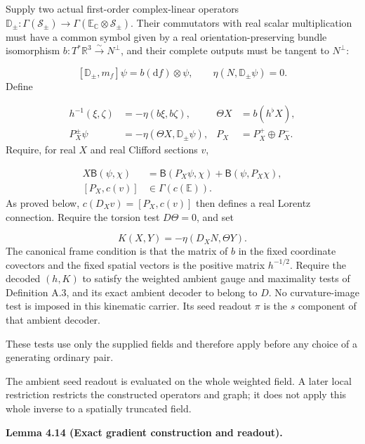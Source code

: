\documentclass[
  english,
  11pt,
  reqno]{amsart}
\makeatletter
\newcommand{\pandocstatementheading}[1]{%
  \par\addpenalty{\@beginparpenalty}%
  \addvspace{.5\baselineskip plus .2\baselineskip minus .2\baselineskip}%
  {\normalfont\bfseries #1\par}%
  \nobreak\@afterindenttrue\@afterheading
}
\makeatother
\begin{document}
Supply two actual first-order complex-linear operators
\(\mathbb D_\pm:\Gamma(\mathscr S_\pm)\to\Gamma(\mathbb E_{\mathbb C}\otimes\mathscr S_\pm)\).
Their commutators with real scalar multiplication must have a common
symbol given by a real orientation-preserving bundle isomorphism
\(b:T^*\mathbb R^3\xrightarrow{\sim}N^\perp\), and their complete
outputs must be tangent to \(N^\perp\):

\label{eq:online-source-symbol-and-tangential-tests} \[
[\mathbb D_\pm,m_f]\psi=b(\mathrm df)\otimes\psi,
\qquad \eta(N,\mathbb D_\pm\psi)=0.
\] Define

\label{eq:online-source-directional-decoder} \[
\begin{aligned}
h^{-1}(\xi,\zeta)&=-\eta(b\xi,b\zeta),
&\Theta X&=b(h^\flat X),\\
P_X^\pm\psi&=-\eta(\Theta X,\mathbb D_\pm\psi),
&P_X&=P_X^+\oplus P_X^-.
\end{aligned}
\] Require, for real \(X\) and real Clifford sections \(v\),

\label{eq:online-source-bilinear-reality-tests} \[
\begin{aligned}
X\mathsf B(\psi,\chi)
&=\mathsf B(P_X\psi,\chi)+\mathsf B(\psi,P_X\chi),\\
[P_X,c(v)]&\in\Gamma(c(\mathbb E)).
\end{aligned}
\] As proved below, \(c(D_Xv)=[P_X,c(v)]\) then defines a real Lorentz
connection. Require the torsion test \(D\Theta=0\), and set

\label{eq:online-source-second-form-readout} \[
K(X,Y)=-\eta(D_XN,\Theta Y).
\] The canonical frame condition is that the matrix of \(b\) in the
fixed coordinate covectors and the fixed spatial vectors is the positive
matrix \(h^{-1/2}\). Require the decoded \((h,K)\) to satisfy the
weighted ambient gauge and maximality tests of Definition A.3, and its
exact ambient decoder to belong to \(D\). No curvature-image test is
imposed in this kinematic carrier. Its seed readout \(\pi\) is the \(s\)
component of that ambient decoder.

These tests use only the supplied fields and therefore apply before any
choice of a generating ordinary pair.

The ambient seed readout is evaluated on the whole weighted field. A
later local restriction restricts the constructed operators and graph;
it does not apply this whole inverse to a spatially truncated field.

\pandocstatementheading{\leavevmode{}\label{lem:online-gradient-exact-kinematic-codec}Lemma 4.14 (Exact gradient construction and readout).}
\end{document}
